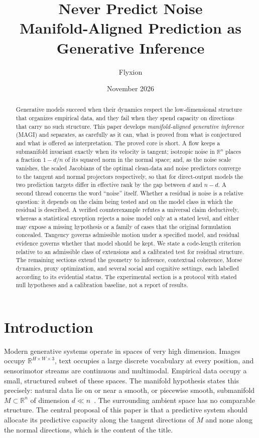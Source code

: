 \documentclass[11pt,a4paper]{article}
\title{\textbf{Never Predict Noise}\\[2pt]
\large Manifold-Aligned Prediction as Generative Inference}
\author{Flyxion}
\date{November 2026}
\theoremstyle{definition}
\theoremstyle{remark}
\newcommand{\R}{\mathbb{R}}
\begin{document}
\maketitle

\begin{abstract}
Generative models succeed when their dynamics respect the low-dimensional
structure that organizes empirical data, and they fail when they spend
capacity on directions that carry no such structure. This paper develops
\emph{manifold-aligned generative inference} (MAGI) and separates, as
carefully as it can, what is proved from what is conjectured and what is
offered as interpretation. The proved core is short. A flow keeps a
submanifold invariant exactly when its velocity is tangent; isotropic
noise in $\R^n$ places a fraction $1-d/n$ of its squared norm in the
normal space; and, as the noise scale vanishes, the scaled Jacobians of the optimal clean-data and noise predictors converge to the tangent and normal projectors respectively, so that for direct-output models the two prediction targets differ in effective rank by the gap between $d$ and $n-d$. A second thread concerns the word ``noise'' itself. Whether a
residual is noise is a relative question: it depends on the claim being
tested and on the model class in which the residual is described. A verified counterexample refutes a universal claim deductively, whereas a statistical exception rejects a noise model only at a stated level, and either may expose a missing hypothesis or a family of cases that the original formulation concealed. Tangency governs admissible motion under a specified model, and residual evidence governs whether that model should be kept. We state a code-length criterion relative to an admissible class of extensions and a calibrated test for residual structure. The
remaining sections extend the geometry to inference, contextual
coherence, Morse dynamics, proxy optimization, and several social and
cognitive settings, each labelled according to its evidential status. The
experimental section is a protocol with stated null hypotheses and a
calibration baseline, not a report of results.
\end{abstract}

\section{Introduction}

Modern generative systems operate in spaces of very high dimension. Images
occupy $\R^{H\times W\times 3}$, text occupies a large discrete
vocabulary at every position, and sensorimotor streams are continuous and
multimodal. Empirical data occupy a small, structured subset of these
spaces. The manifold hypothesis states this precisely: natural data lie on
or near a smooth, or piecewise smooth, submanifold $M\subset\R^n$ of
dimension $d\ll n$~\cite{fefferman2016testing}. The surrounding ambient
space has no comparable structure. The central proposal of this paper is
that a predictive system should allocate its predictive capacity along the
tangent directions of $M$ and none along the normal directions, which is
the content of the title.
\end{document}
